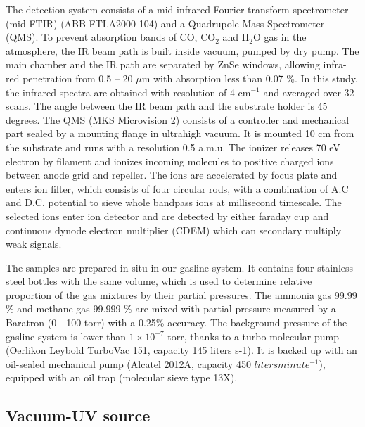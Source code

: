 The detection system consists of a mid-infrared Fourier transform spectrometer (mid-FTIR) (ABB FTLA2000-104) and a Quadrupole Mass Spectrometer (QMS). To prevent absorption bands of CO, CO$_2$ and H$_2$O gas in the atmosphere, the IR beam path is built inside vacuum, pumped by dry pump. The main chamber and the IR path are separated by ZnSe windows, allowing infra-red penetration from 0.5 – 20 $\mu$m with absorption less than 0.07 \%. In this study, the infrared spectra are obtained with resolution of 4 cm$^{-1}$ and averaged over 32 scans. The angle between the IR beam path and the substrate holder is 45 degrees. The QMS (MKS Microvision 2) consists of a controller and mechanical part sealed by a mounting flange in ultrahigh vacuum. It is mounted 10 cm from the substrate and runs with a resolution 0.5 a.m.u. The ionizer releases 70 eV electron by filament and ionizes incoming molecules to positive charged ions between anode grid and repeller. The ions are accelerated by focus plate and enters ion filter, which consists of four circular rods, with a combination of A.C and D.C. potential to sieve whole bandpass ions at millisecond timescale. The selected ions enter ion detector and are detected by either faraday cup and continuous dynode electron multiplier (CDEM) which can secondary multiply weak signals.

The samples are prepared in situ in our gasline system. It contains four stainless steel bottles with the same volume, which is used to determine relative proportion of the gas mixtures by their partial pressures. The ammonia gas 99.99 \% and methane gas 99.999 \% are mixed with partial pressure measured by a Baratron (0 - 100 torr) with a 0.25\% accuracy. The background pressure of the gasline system is lower than $1 \times 10^{-7}$ torr, thanks to a turbo molecular pump (Oerlikon Leybold TurboVac 151, capacity 145 liters s-1). It is backed up with an oil-sealed mechanical pump (Alcatel 2012A, capacity 450 $liters minute^{-1}$), equipped with an oil trap (molecular sieve type 13X).

\subsection{Vacuum-UV source}
\label{sec:Vacuum_UV_source}


